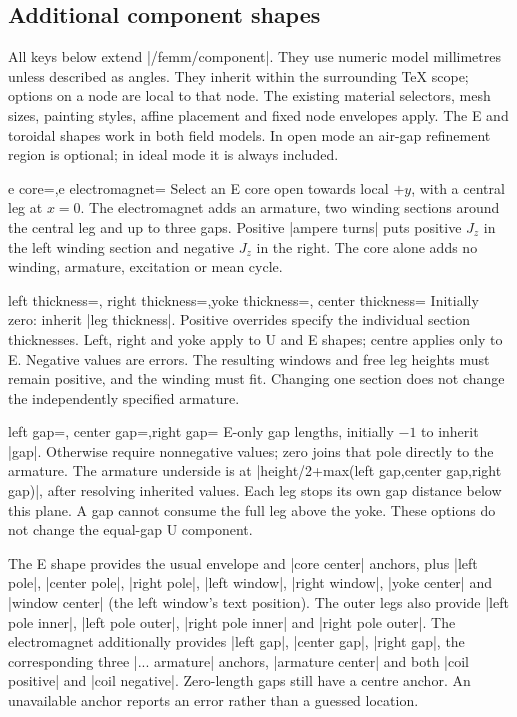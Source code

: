 \subsection{Additional component shapes}
All keys below extend |/femm/component|. They use numeric model millimetres
unless described as angles. They inherit within the surrounding TeX scope;
options on a node are local to that node. The existing material selectors,
mesh sizes, painting styles, affine placement and fixed node envelopes apply.
The E and toroidal shapes work in both field models. In open mode an air-gap
refinement region is optional; in ideal mode it is always included.

\begin{keylist}{e core=,e electromagnet=}
Select an E core open towards local $+y$, with a central leg at $x=0$.
The electromagnet adds an armature, two winding sections around the central
leg and up to three gaps. Positive |ampere turns| puts positive $J_z$ in
the left winding section and negative $J_z$ in the right. The core alone
adds no winding, armature, excitation or mean cycle.
\end{keylist}
\begin{keylist}{left thickness=,
 right thickness=,yoke thickness=,
 center thickness=}
Initially zero: inherit |leg thickness|. Positive overrides specify the
individual section thicknesses. Left, right and yoke apply to U and E shapes;
centre applies only to E. Negative values are errors. The resulting windows
and free leg heights must remain positive, and the winding must fit.
Changing one section does not change the independently specified armature.
\end{keylist}
\begin{keylist}{left gap=,
 center gap=,right gap=}
E-only gap lengths, initially $-1$ to inherit |gap|. Otherwise require
nonnegative values; zero joins that pole directly to the armature.
The armature underside is at |height/2+max(left gap,center gap,right gap)|,
after resolving inherited values. Each leg stops its own gap distance below
this plane. A gap cannot consume the full leg above the yoke. These options
do not change the equal-gap U component.
\end{keylist}

The E shape provides the usual envelope and |core center| anchors, plus
|left pole|, |center pole|, |right pole|, |left window|, |right window|,
|yoke center| and |window center| (the left window's text position).
The outer legs also provide |left pole inner|, |left pole outer|,
|right pole inner| and |right pole outer|. The electromagnet additionally
provides |left gap|, |center gap|, |right gap|, the corresponding three
|... armature| anchors, |armature center| and both |coil positive| and
|coil negative|. Zero-length gaps still have a centre anchor.
An unavailable anchor reports an error rather than a guessed location.

